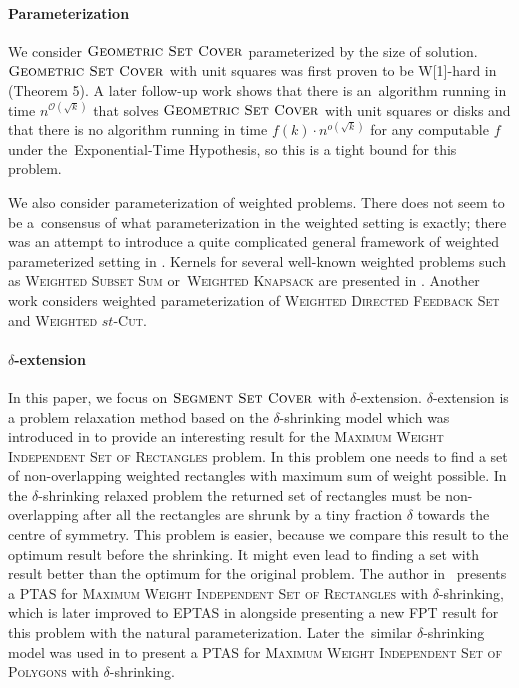 \paragraph{Parameterization}
We consider $\textsc{Geometric Set Cover}$ 
parameterized by the size of solution.
$\textsc{Geometric Set Cover}$ with unit squares was first proven to be W[1]-hard 
in \cite{marx05} (Theorem 5). A later follow-up work \cite{voronoi}
shows that there is an~algorithm running in time $n^{\mathcal{O}(\sqrt{k})}$
that solves $\textsc{Geometric Set Cover}$ with unit squares or disks
and that there is no algorithm running in time $f(k) \cdot n^{o(\sqrt{k})}$
for any computable $f$ under the~Exponential-Time Hypothesis,
so this is a tight bound for this problem.

We also consider parameterization of weighted problems.
There does not seem to be a~consensus of what parameterization
in the weighted setting is exactly; there
was an attempt to introduce a quite complicated general
framework of weighted parameterized setting in \cite{weighted_framework}.
Kernels for several well-known weighted problems
such as \textsc{Weighted Subset Sum} or~\textsc{Weighted Knapsack} are presented in \cite{kernel_weighted}.
Another work \cite{weighted_flow} considers weighted
parameterization of \textsc{Weighted Directed Feedback Set} and \textsc{Weighted $st$-Cut}.

\paragraph{$\delta$-extension}
In this paper, we focus on $\textsc{Segment Set Cover}$ with $\delta$-extension.
$\delta$-extension is a problem relaxation method based on the
$\delta$-shrinking model which was introduced in \cite{shrinking_original}
to provide an interesting result for
the \textsc{Maximum Weight Independent Set of Rectangles} problem.
In this problem one needs to find a set of non-overlapping
weighted rectangles with maximum sum of weight possible.
In the $\delta$-shrinking relaxed problem
the returned set of rectangles must be non-overlapping
after all the rectangles are shrunk by a tiny fraction $\delta$
towards the centre of symmetry.
This problem is easier, because we compare this result
to the optimum result before the shrinking. It might
even lead to finding a set with result better than the optimum
for the original problem.
The author in~\cite{shrinking_original} presents a PTAS
for \textsc{Maximum Weight Independent Set of Rectangles} with $\delta$-shrinking,
which is later improved to EPTAS in \cite{shrinking1} alongside
presenting a new FPT result for this problem with the natural parameterization.
Later the~similar $\delta$-shrinking model was used in \cite{shrinking2}
to present a PTAS for
\textsc{Maximum Weight Independent Set of Polygons} with $\delta$-shrinking.

